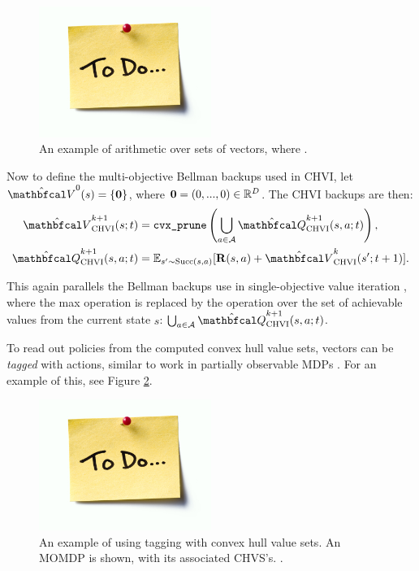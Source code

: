         \begin{figure}
            \centering\includegraphics[width=0.5\textwidth]{figures/todo.jpg} 
            \caption[An example of arithmetic over sets of vectors.]{An example of arithmetic over sets of vectors, where .}
            \label{fig:vectorset_arithmatic}
        \end{figure}

        Now to define the multi-objective Bellman backups used in CHVI, let $\hat{\bfcl{V}}^0(s) = \{ \bff{0} \}$, where $\mathbf{0}=(0,...,0)\in\mathbb{R}^D$. The CHVI backups are then:
        \begin{align}
            \Vchvi^{k+1}(s;t) &= \cprune \left( \bigcup_{a\in\cl{A}} \Qchvi^{k+1}(s,a;t) \right), \\
            \Qchvi^{k+1}(s,a;t) &= \bb{E}_{s'\sim \suc{s}{a}} [\bff{R}(s,a) + \Vchvi^k(s';t+1)].
        \end{align}
        
        This again parallels the Bellman backups use in single-objective value iteration , where the max operation is replaced by the \cprune\ewe operation over the set of achievable values from the current state $s$: $\bigcup_{a\in\cl{A}} \Qchvi^{k+1}(s,a;t)$.

        To read out policies from the computed convex hull value sets, vectors can be \textit{tagged} with actions, similar to work in partially observable MDPs . For an example of this, see Figure \ref{fig:chvs_tagging}.

        \begin{figure}
            \centering\includegraphics[width=0.5\textwidth]{figures/todo.jpg} 
            \caption[An example of using tagging with convex hull value sets.]{An example of using tagging with convex hull value sets. An MOMDP is shown, with its associated CHVS's. .}
            \label{fig:chvs_tagging}
        \end{figure}

